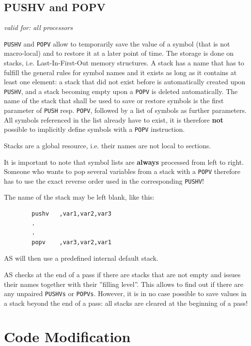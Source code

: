 \documentclass[12pt,twoside]{report}
\makeatletter
\newcommand{\bb}[1]{{\bf #1}}
\newcommand{\tty}[1]{{\tt #1}}
\newcommand{\ttindex}[1]{\index{#1@{\tt #1}}}
\newcommand{\asname}{{AS}}
\makeatother
\begin{document}

\subsection{PUSHV and POPV}
\ttindex{PUSHV}\ttindex{POPV}

{\em valid for: all processors}

\tty{PUSHV} and \tty{POPV} allow to temporarily save the value of a symbol
(that is not macro-local) and to restore it at a later point of time.  The
storage is done on stacks, i.e. Last-In-First-Out memory structures.  A
stack has a name that has to fulfill the general rules for symbol names
and it exists as long as it contains at least one element: a stack that
did not exist before is automatically created upon \tty{PUSHV}, and a
stack becoming empty upon a \tty{POPV} is deleted automatically.  The name
of the stack that shall be used to save or restore symbols is the first
parameter of \tty{PUSH} resp. \tty{POPV}, followed by a list of symbols as
further parameters.  All symbols referenced in the list already have to
exist, it is therefore \bb{not} possible to implicitly define symbols with
a \tty{POPV} instruction.

Stacks are a global resource, i.e. their names are not local to
sections.

It is important to note that symbol lists are \bb{always} processed from
left to right.  Someone who wants to pop several variables from a stack
with a \tty{POPV} therefore has to use the exact reverse order used in the
corresponding \tty{PUSHV}!

The name of the stack may be left blank, like this:
\begin{verbatim}
        pushv   ,var1,var2,var3
        .
        .
        popv    ,var3,var2,var1
\end{verbatim}
\asname{} will then use a predefined internal default stack.

\asname{} checks at the end of a pass if there are stacks that are not empty and
issues their names together with their ''filling level''.  This allows to
find out if there are any unpaired \tty{PUSHVs} or \tty{POPVs}.  However,
it is in no case possible to save values in a stack beyond the end of a
pass: all stacks are cleared at the beginning of a pass!


\section{Code Modification}
\end{document}
